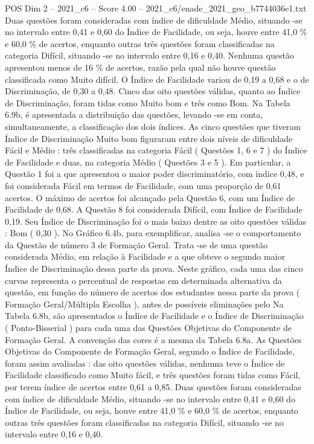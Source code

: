 \begin{textsample}{POS Dim 2 – 2021\_c6 – Score 4.00 – 2021\_c6/enade\_2021\_geo\_b7744036e1.txt}
Duas questões foram consideradas com índice de dificuldade Médio, situando -se no intervalo entre 0,41 e 0,60 do Índice de Facilidade, ou seja, houve entre 41,0 \% e 60,0 \% de acertos, enquanto outras três questões foram classificadas na categoria Difícil, situando -se no intervalo entre 0,16 e 0,40.
Nenhuma questão apresentou menos de 16 \% de acertos, razão pela qual não houve questão classificada como Muito difícil.
O Índice de Facilidade variou de 0,19 a 0,68 e o de Discriminação, de 0,30 a 0,48.
Cinco das oito questões válidas, quanto ao Índice de Discriminação, foram tidas como Muito bom e três como Bom.
Na Tabela 6.9b, é apresentada a distribuição das questões, levando -se em conta, simultaneamente, a classificação dos dois índices.
As cinco questões que tiveram Índice de Discriminação Muito bom figuraram entre dois níveis de dificuldade Fácil e Médio : três classificadas na categoria Fácil ( Questões 1, 6 e 7 ) do Índice de Facilidade e duas, na categoria Médio ( Questões 3 e 5 ).
Em particular, a Questão 1 foi a que apresentou o maior poder discriminatório, com índice 0,48, e foi considerada Fácil em termos de Facilidade, com uma proporção de 0,61 acertos.
O máximo de acertos foi alcançado pela Questão 6, com um Índice de Facilidade de 0,68.
A Questão 8 foi considerada Difícil, com Índice de Facilidade 0,19.
Seu Índice de Discriminação foi o mais baixo dentre as oito questões válidas : Bom ( 0,30 ).
No Gráfico 6.4b, para exemplificar, analisa -se o comportamento da Questão de número 3 de Formação Geral.
Trata -se de uma questão considerada Médio, em relação à Facilidade e a que obteve o segundo maior Índice de Discriminação dessa parte da prova.
Neste gráfico, cada uma das cinco curvas representa o percentual de respostas em determinada alternativa da questão, em função do número de acertos dos estudantes nessa parte da prova ( Formação Geral/Múltipla Escolha ), antes de possíveis eliminações pelo Na Tabela 6.8b, são apresentados o Índice de Facilidade e o Índice de Discriminação ( Ponto-Bisserial ) para cada uma das Questões Objetivas do Componente de Formação Geral.
A convenção das cores é a mesma da Tabela 6.8a.
As Questões Objetivas do Componente de Formação Geral, segundo o Índice de Facilidade, foram assim avaliadas : das oito questões válidas, nenhuma teve o Índice de Facilidade classificado como Muito fácil, e três questões foram tidas como Fácil, por terem índice de acertos entre 0,61 a 0,85.
Duas questões foram consideradas com índice de dificuldade Médio, situando -se no intervalo entre 0,41 e 0,60 do Índice de Facilidade, ou seja, houve entre 41,0 \% e 60,0 \% de acertos, enquanto outras três questões foram classificadas na categoria Difícil, situando -se no intervalo entre 0,16 e 0,40.

\end{textsample}
